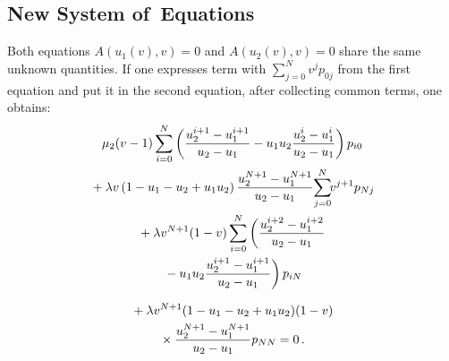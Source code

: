 \begin{multicols}{2}
{}


\section{New System of~Equations}

\noindent
Both equations $A(u_1(v),v)=0$ and $A(u_2(v),v)=0$
share the same unknown quantities.
If one expresses term with 
$\sum_{j=0}^N v^j p_{0j}$
from the first equation and put it in the second equation, after collecting
common terms, one obtains:
\begin{multline*}
\mu_2(v-1)\sum\limits_{i=0}^N 
\left(\displaystyle\frac{\displaystyle u_2^{i+1}-u_1^{i+1}\mathstrut}{\displaystyle u_2-u_1\mathstrut}-
u_1u_2 \displaystyle\frac{\displaystyle u_2^{i}-u_1^{i}\mathstrut}{\displaystyle u_2-u_1\mathstrut}\right)
p_{i0}\\
{}+
\lambda v\left(1-u_1-u_2+u_1u_2\right)
\displaystyle\frac{\displaystyle u_2^{N+1}-u_1^{N+1}\mathstrut}{\displaystyle u_2-u_1\mathstrut}\!\sum\limits_{j=0}^N\!\! v^{j+1} p_{Nj}\\
{}+
\lambda v^{N+1}(1-v)\sum\limits_{i=0}^N 
\left ( 
\displaystyle\frac{\displaystyle u_2^{i+2}-u_1^{i+2}\mathstrut}{\displaystyle u_2-u_1\mathstrut}\right.\\
\left.{}-
 u_1u_2\displaystyle\frac{\displaystyle u_2^{i+1}-u_1^{i+1}\mathstrut}{\displaystyle u_2-u_1\mathstrut}
\right)p_{iN}
\end{multline*}

\noindent
\begin{multline}
{}+
\lambda v^{N+1}
{(1-u_1-u_2+u_1u_2)}(1-v)\\
{}\times{}
\displaystyle\frac{\displaystyle u_2^{N+1}-u_1^{N+1}\mathstrut}{\displaystyle u_2-u_1\mathstrut}p_{NN}=0\,.
\label{eq-new-1}
\end{multline}


\end{multicols}
